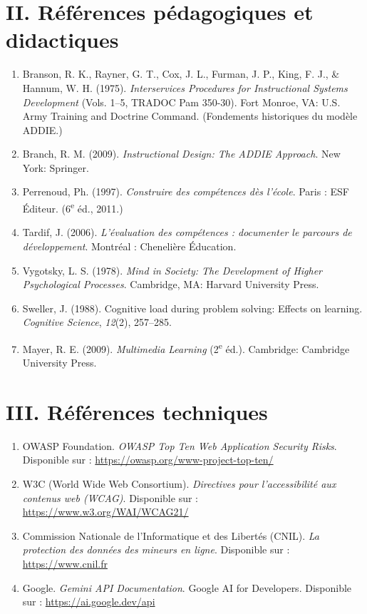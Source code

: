 \documentclass[12pt, a4paper, oneside]{report}
\begin{document}
\section*{II. Références pédagogiques et didactiques}
\begin{enumerate}[leftmargin=*]
  \item Branson, R. K., Rayner, G. T., Cox, J. L., Furman, J. P., King, F. J., \& Hannum, W. H. (1975). \textit{Interservices Procedures for Instructional Systems Development} (Vols. 1--5, TRADOC Pam 350-30). Fort Monroe, VA: U.S. Army Training and Doctrine Command. (Fondements historiques du modèle ADDIE.)

  \item Branch, R. M. (2009). \textit{Instructional Design: The ADDIE Approach}. New York: Springer.

  \item Perrenoud, Ph. (1997). \textit{Construire des compétences dès l'école}. Paris : ESF Éditeur. (6\textsuperscript{e} éd., 2011.)

  \item Tardif, J. (2006). \textit{L'évaluation des compétences : documenter le parcours de développement}. Montréal : Chenelière Éducation.

  \item Vygotsky, L. S. (1978). \textit{Mind in Society: The Development of Higher Psychological Processes}. Cambridge, MA: Harvard University Press.

  \item Sweller, J. (1988). Cognitive load during problem solving: Effects on learning. \textit{Cognitive Science}, \textit{12}(2), 257--285.

  \item Mayer, R. E. (2009). \textit{Multimedia Learning} (2\textsuperscript{e} éd.). Cambridge: Cambridge University Press.

\end{enumerate}

\section*{III. Références techniques}
\begin{enumerate}[leftmargin=*]
  \item OWASP Foundation. \textit{OWASP Top Ten Web Application Security Risks}. Disponible sur : \url{https://owasp.org/www-project-top-ten/}

  \item W3C (World Wide Web Consortium). \textit{Directives pour l'accessibilité aux contenus web (WCAG)}. Disponible sur : \url{https://www.w3.org/WAI/WCAG21/}

  \item Commission Nationale de l'Informatique et des Libertés (CNIL). \textit{La protection des données des mineurs en ligne}. Disponible sur : \url{https://www.cnil.fr}

  \item Google. \textit{Gemini API Documentation}. Google AI for Developers. Disponible sur : \url{https://ai.google.dev/api}
\end{enumerate}
\end{document}
